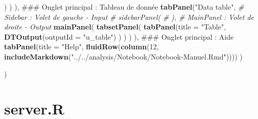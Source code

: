 \documentclass[]{report}
\newenvironment{Shaded}{\begin{snugshade}}{\end{snugshade}}
\newcommand{\KeywordTok}[1]{\textcolor[rgb]{0.13,0.29,0.53}{\textbf{#1}}}
\newcommand{\DataTypeTok}[1]{\textcolor[rgb]{0.13,0.29,0.53}{#1}}
\newcommand{\DecValTok}[1]{\textcolor[rgb]{0.00,0.00,0.81}{#1}}
\newcommand{\StringTok}[1]{\textcolor[rgb]{0.31,0.60,0.02}{#1}}
\newcommand{\CommentTok}[1]{\textcolor[rgb]{0.56,0.35,0.01}{\textit{#1}}}
\newcommand{\NormalTok}[1]{#1}
\begin{document}
\begin{Shaded}
\begin{Highlighting}[]
\NormalTok{               )}
\NormalTok{             )}
\NormalTok{    ),}
\NormalTok{    ### Onglet principal : Tableau de donnée}
    \KeywordTok{tabPanel}\NormalTok{(}\StringTok{"Data table"}\NormalTok{,}
             \CommentTok{# Sidebar : Volet de gauche - Input}
             \CommentTok{# sidebarPanel(}
             \CommentTok{# ),}
             \CommentTok{# MainPanel : Volet de droite - Output}
             \KeywordTok{mainPanel}\NormalTok{(}
               \KeywordTok{tabsetPanel}\NormalTok{(}
                 \KeywordTok{tabPanel}\NormalTok{(}\DataTypeTok{title =} \StringTok{"Table"}\NormalTok{, }\KeywordTok{DTOutput}\NormalTok{(}\DataTypeTok{outputId =} \StringTok{"u_table"}\NormalTok{)}
\NormalTok{                          )}
\NormalTok{               )}
\NormalTok{             )}
\NormalTok{    ),}
\NormalTok{    ### Onglet principal : Aide}
    \KeywordTok{tabPanel}\NormalTok{(}\DataTypeTok{title =} \StringTok{"Help"}\NormalTok{,}
             \KeywordTok{fluidRow}\NormalTok{(}\KeywordTok{column}\NormalTok{(}\DecValTok{12}\NormalTok{, }\KeywordTok{includeMarkdown}\NormalTok{(}\StringTok{"../../analysis/Notebook/Notebook-Manuel.Rmd"}\NormalTok{))))}
\NormalTok{  )}

\NormalTok{)}
\end{Highlighting}
\end{Shaded}

\section{server.R}\label{server.r}
\end{document}
